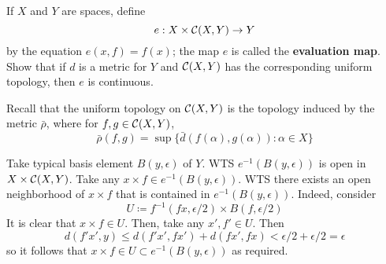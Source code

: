 \documentclass[a4paper, 10pt]{article}
\begin{document}
\begin{problem} [43.8 \done]
    If $X$ and $Y$ are spaces, define \begin{equation*}
    e: X \times \mathcal{C}(X, Y) \to Y
    \end{equation*}
    by the equation $e(x, f) = f(x)$; the map $e$ is called the \textbf{evaluation map}. Show that if $d$ is a metric for $Y$ and $\mathcal{C}(X, Y)$ has the corresponding uniform topology, then $e$ is continuous.
\end{problem}
\begin{solution}
    Recall that the uniform topology on $\mathcal{C}(X, Y)$ is the topology induced by the metric $\bar{\rho}$, where for $f, g \in \mathcal{C}(X, Y)$,
    \begin{equation*}
    \bar{\rho}(f, g) = \sup \{\bar{d}(f( \alpha), g(\alpha)) : \alpha \in X\}
    \end{equation*}

    Take typical basis element $B(y, \epsilon)$ of $Y$. WTS $e^{-1}(B(y, \epsilon))$ is open in $X \times \mathcal{C}(X, Y)$. Take any $x \times f \in e^{-1}(B(y, \epsilon))$. WTS there exists an open neighborhood of $x \times f$ that is contained in $e^{-1}(B(y, \epsilon))$. Indeed, consider \begin{equation*}
    U \coloneqq f^{-1}(fx, \epsilon/2) \times B(f, \epsilon / 2)
    \end{equation*}
    It is clear that $x \times f \in U$. Then, take any $x', f' \in U$. Then \begin{equation*}
    d(f'x', y) \leq d(f'x', fx') + d(fx', fx) < \epsilon/2 + \epsilon/2 = \epsilon
    \end{equation*}
    so it follows that $x \times f \in U \subset e^{-1}(B(y, \epsilon))$ as required.
\end{solution}
\end{document}
